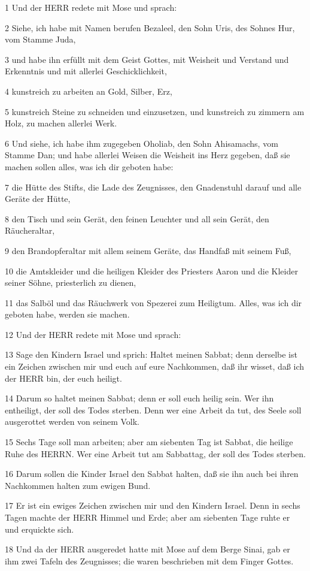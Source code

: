 \par 1 Und der HERR redete mit Mose und sprach:
\par 2 Siehe, ich habe mit Namen berufen Bezaleel, den Sohn Uris, des Sohnes Hur, vom Stamme Juda,
\par 3 und habe ihn erfüllt mit dem Geist Gottes, mit Weisheit und Verstand und Erkenntnis und mit allerlei Geschicklichkeit,
\par 4 kunstreich zu arbeiten an Gold, Silber, Erz,
\par 5 kunstreich Steine zu schneiden und einzusetzen, und kunstreich zu zimmern am Holz, zu machen allerlei Werk.
\par 6 Und siehe, ich habe ihm zugegeben Oholiab, den Sohn Ahisamachs, vom Stamme Dan; und habe allerlei Weisen die Weisheit ins Herz gegeben, daß sie machen sollen alles, was ich dir geboten habe:
\par 7 die Hütte des Stifts, die Lade des Zeugnisses, den Gnadenstuhl darauf und alle Geräte der Hütte,
\par 8 den Tisch und sein Gerät, den feinen Leuchter und all sein Gerät, den Räucheraltar,
\par 9 den Brandopferaltar mit allem seinem Geräte, das Handfaß mit seinem Fuß,
\par 10 die Amtskleider und die heiligen Kleider des Priesters Aaron und die Kleider seiner Söhne, priesterlich zu dienen,
\par 11 das Salböl und das Räuchwerk von Spezerei zum Heiligtum. Alles, was ich dir geboten habe, werden sie machen.
\par 12 Und der HERR redete mit Mose und sprach:
\par 13 Sage den Kindern Israel und sprich: Haltet meinen Sabbat; denn derselbe ist ein Zeichen zwischen mir und euch auf eure Nachkommen, daß ihr wisset, daß ich der HERR bin, der euch heiligt.
\par 14 Darum so haltet meinen Sabbat; denn er soll euch heilig sein. Wer ihn entheiligt, der soll des Todes sterben. Denn wer eine Arbeit da tut, des Seele soll ausgerottet werden von seinem Volk.
\par 15 Sechs Tage soll man arbeiten; aber am siebenten Tag ist Sabbat, die heilige Ruhe des HERRN. Wer eine Arbeit tut am Sabbattag, der soll des Todes sterben.
\par 16 Darum sollen die Kinder Israel den Sabbat halten, daß sie ihn auch bei ihren Nachkommen halten zum ewigen Bund.
\par 17 Er ist ein ewiges Zeichen zwischen mir und den Kindern Israel. Denn in sechs Tagen machte der HERR Himmel und Erde; aber am siebenten Tage ruhte er und erquickte sich.
\par 18 Und da der HERR ausgeredet hatte mit Mose auf dem Berge Sinai, gab er ihm zwei Tafeln des Zeugnisses; die waren beschrieben mit dem Finger Gottes.


